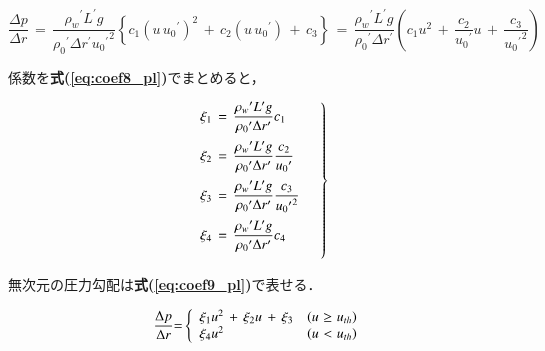 \begin{equation}
\frac{\Delta p}{\Delta r} 
\,=\,
\frac{{\rho_{w}}^{\prime} L^{\prime} g} {{\rho_{0}}^{\prime} \Delta r^{\prime} {{u_{0}}^{\prime}}^{2}} 
\left\{{ 
c_{1} {\left({ u\, {u_{0}}^{\prime} }\right) }^{2} \,+\, c_{2} \left({ u\, {u_{0}}^{\prime} }\right)  \,+\, c_{3}
}\right\}
\,=\,
\frac{{\rho_{w}}^{\prime} L^{\prime} g} {{\rho_{0}}^{\prime} \Delta r^{\prime}} \left({
c_{1} u^{2} \,+\, \frac{c_{2}}{{u_{0}}^{\prime}} u \,+\, \frac{c_{3}}{{{u_{0}}^{\prime}}^{2}}
}\right)
\label{eq:coef7_pl}
\end{equation}

\noindent 係数を\textbf{式(\ref{eq:coef8_pl})}でまとめると，

\begin{equation}
\left.{
\begin{array}{l}
\vspace{2mm}
\displaystyle{ \xi_{1} \,=\, \frac{ {\rho_{w}}^{\prime} L^{\prime} g} { {\rho_{0}}^{\prime} \Delta r^{\prime}} c_{1} }\\
\vspace{2mm}
\displaystyle{ \xi_{2} \,=\, \frac{ {\rho_{w}}^{\prime} L^{\prime} g} { {\rho_{0}}^{\prime} \Delta r^{\prime}} \frac{c_{2}}{{u_{0}}^{\prime}} }\\
\vspace{2mm}
\displaystyle{ \xi_{3} \,=\, \frac{ {\rho_{w}}^{\prime} L^{\prime} g} { {\rho_{0}}^{\prime} \Delta r^{\prime}} \frac{c_{3}}{{{u_{0}}^{\prime}}^{2}} }\\
\vspace{2mm}
\displaystyle{ \xi_{4} \,=\, \frac{ {\rho_{w}}^{\prime} L^{\prime} g} { {\rho_{0}}^{\prime} \Delta r^{\prime}} c_{4} }
\end{array} \quad }\right\}
\label{eq:coef8_pl}
\end{equation}

\noindent 無次元の圧力勾配は\textbf{式(\ref{eq:coef9_pl})}で表せる．

\begin{equation}
\frac{\mathrm{\Delta}{p}}{\mathrm{\Delta}{r}} \mathrm{{=}} \left\{{\begin{array}{ll}
{{\mathit{\xi}}_{1}{u}^{2} \,+\, {\mathit{\xi}}_{2}{u} \,+\, {\mathit{\xi}}_{3}} & {\left({{u}\hspace{0.33em}\mathrm{\geq}\hspace{0.33em}{u}_{th}}\right)}\\
{{\mathit{\xi}}_{4}{u}^{2}} & {\left({{u}\hspace{0.33em}{\mathrm{<}}\hspace{0.33em}{u}_{th}}\right)}\end{array}}\right.
\label{eq:coef9_pl}
\end{equation}

